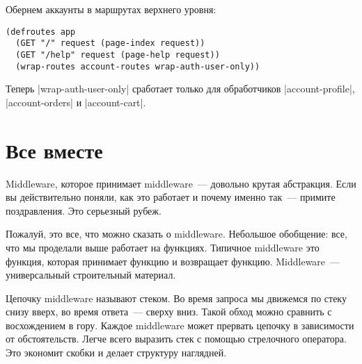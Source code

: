 Обернем аккаунты в маршрутах верхнего уровня:

\begin{verbatim}
(defroutes app
  (GET "/" request (page-index request))
  (GET "/help" request (page-help request))
  (wrap-routes account-routes wrap-auth-user-only))
\end{verbatim}

Теперь \spverb|wrap-auth-user-only| сработает только для обработчиков
\spverb|account-profile|, \spverb|account-orders| и \spverb|account-cart|.

\section{Все вместе}

Middleware, которое принимает middleware~--- довольно крутая абстракция. Если вы
действительно поняли, как это работает и почему именно так~--- примите
поздравления. Это серьезный рубеж.

Пожалуй, это все, что можно сказать о middleware. Небольшое обобщение: все, что
мы проделали выше работает на функциях. Типичное middleware это функция, которая
принимает функцию и возвращает функцию. Middleware~--- универсальный строительный
материал.

Цепочку middleware называют стеком. Во время запроса мы движемся по стеку снизу
вверх, во время ответа~--- сверху вниз. Такой обход можно сравнить с восхождением
в гору. Каждое middleware может прервать цепочку в зависимости от
обстоятельств. Легче всего выразить стек с помощью стрелочного оператора. Это
экономит скобки и делает структуру наглядней.


